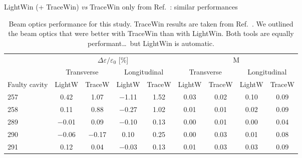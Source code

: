 \begin{frame}[t]
\begin{columns}[t]
\begin{column}{\colwidth}
         \begin{block}{LightWin (+ TraceWin) \emph{vs} TraceWin only from Ref.~: similar performances}
            \begin{table}
               \caption{%
                  Beam optics performance for this study.
                  TraceWin results are taken from Ref.~.
                  We outlined the beam optics that were better with TraceWin than with LightWin.
                  \alert{Both tools are equally performant\ldots~but LightWin is automatic.}
               }
               \label{tab:optics}
               \begin{center}
                  \begin{tabular}{@{} l c c c c c c c c @{}}
                     \toprule
                     & \multicolumn{4}{c}{$\Delta\varepsilon/\varepsilon_0$ [\si{\percent}]}     & \multicolumn{4}{c}{M} \\
                     \cmidrule(l){2-5}         \cmidrule(r){6-9}         
                     & \multicolumn{2}{c}{Transverse} &\multicolumn{2}{c}{Longitudinal} &\multicolumn{2}{c}{Transverse} &\multicolumn{2}{c}{Longitudinal} \\
                     \cmidrule(l){2-3}\cmidrule(rl){4-5}\cmidrule(rl){6-7}\cmidrule(r){8-9}
                     Faulty cavity & LightW  & TraceW       & LightW    & TraceW    & LightW & TraceW         & LightW  & TraceW                    \\
                     \midrule                                                                                                                                   
                     257  & \num{ 0.42}         &\num{1.07}        & \num{-1.11} &  \num{1.52} & \alert{\num{0.03}} & \alert{\num{0.02}} & \alert{\num{0.10}}& \alert{\num{0.09}}  \\
                     258  & \num{ 0.11}         &\num{0.88}        & \num{-0.27} &  \num{1.02} & \num{0.01} & \num{0.01}         & \num{0.02}& \num{0.09}                   \\
                     289  & \num{-0.01}         &\num{0.09}        & \num{-0.10} &  \num{0.13} & \num{0.00} & \num{0.01}         & \num{0.00}& \num{0.04}                   \\
                     290  & \num{-0.06}         &\num{-0.17}       & \num{ 0.10} &  \num{0.25} & \num{0.00} & \num{0.03}         & \num{0.01}& \num{0.08}                   \\
                     291  & \alert{\num{ 0.12}} &\alert{\num{0.04}}& \num{-0.03} &  \num{0.13} & \num{0.01} & \num{0.03}         & \num{0.03}& \num{0.09}                   \\

\end{tabular}
\end{center}
\end{table}
\end{block}
\end{column}
\end{columns}
\end{frame}
